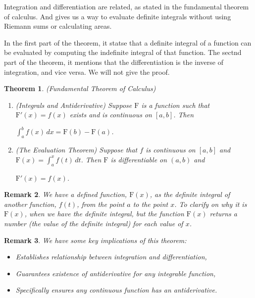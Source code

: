 \documentclass[a4paper]{book}
\newtheorem{theorem}{Theorem}%
\newtheorem{remark}[theorem]{Remark}%
\numberwithin{theorem}{section}%
\begin{document}
Integration and differentiation are related, as stated in the fundamental theorem of calculus. And gives us a way to evaluate definite integrals without using Riemann sums or calculating areas. 

In the first part of the theorem, it statse that a definite integral of a function can be evaluated by computing the indefinite integral of that function. The sectnd part of the theorem, it mentions that the differentiation is the inverse of integration, and vice versa. We will not give the proof.

\begin{theorem} (Fundamental Theorem of Calculus)
    \begin{enumerate}
        \item (Integrals and Antiderivative) Suppose $\mathrm{F}$ is a function such that $\mathrm{F}'(x)=f(x)$ exists and is continuous on $[a,b]$. Then
        \begin{center}
            $\displaystyle \int_{a}^{b}f(x)\,dx=\mathrm{F}(b)-\mathrm{F}(a)$.
        \end{center}

        \item (The Evaluation Theorem) Suppose that $f$ is continuous on $[a,b]$ and $\displaystyle \mathrm{F}(x)=\int_{a}^{x}f(t)\,dt$. Then $\mathrm{F}$ is differentiable on $(a,b)$ and
        \begin{center}
            $\displaystyle \mathrm{F}'(x)=f(x)$.
        \end{center}
    \end{enumerate}
\end{theorem}

\begin{remark}
    We have a defined function, $\mathrm{F}(x)$, as the definite integral of another function, $f(t)$, from the point $a$ to the point $x$. To clarify on why it is $\mathrm{F}(x)$, when we have the definite integral, but the function $\mathrm{F}(x)$ returns a number (the value of the definite integral) for each value of $x$.
\end{remark}

\begin{remark}
    We have some key implications of this theorem:
    \begin{itemize}
        \item Establishes relationship between integration and differentiation,
        \item Guarantees existence of antiderivative for any integrable function,
        \item Specifically ensures any continuous function has an antiderivative.
    \end{itemize}
\end{remark}
\end{document}

